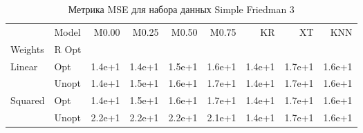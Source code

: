 \begin{table}
\caption{Метрика MSE для набора данных Simple Friedman 3}
\label{tab:MSE_Simple Friedman 3}
\begin{tabular}{llrrrrrrr}
\toprule
 & Model & M0.00 & M0.25 & M0.50 & M0.75 & KR & XT & KNN \\
Weights & R Opt &  &  &  &  &  &  &  \\
\midrule
\multirow[t]{2}{*}{Linear} & Opt & 1.4e+1 & 1.4e+1 & 1.5e+1 & 1.6e+1 & 1.4e+1 & 1.7e+1 & 1.6e+1 \\
 & Unopt & 1.4e+1 & 1.5e+1 & 1.6e+1 & 1.7e+1 & 1.4e+1 & 1.7e+1 & 1.6e+1 \\

\multirow[t]{2}{*}{Squared} & Opt & 1.4e+1 & 1.5e+1 & 1.6e+1 & 1.7e+1 & 1.4e+1 & 1.7e+1 & 1.6e+1 \\
 & Unopt & 2.2e+1 & 2.2e+1 & 2.2e+1 & 2.1e+1 & 1.4e+1 & 1.7e+1 & 1.6e+1 \\

\bottomrule
\end{tabular}
\end{table}
